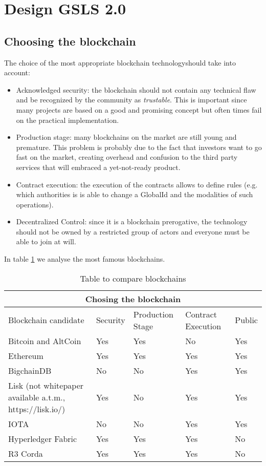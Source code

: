 
\section{Design GSLS 2.0}

\subsection{Choosing the blockchain}
The choice of the most appropriate blockchain technologyshould take into account:

\begin{itemize}
  \item Acknowledged security: the blockchain should not contain any technical flaw and be recognized by the community as \textit{trustable}. This is important since many projects are based on a good and promising concept but often times fail on the practical implementation.
  \item Production stage: many blockchains on the market are still young and premature. This problem is probably due to the fact that investors want to go fast on the market, creating overhead and confusion to the third party services that will embraced a yet-not-ready product.
  \item Contract execution: the execution of the contracts allows to define rules (e.g. which authorities is is able to change a GlobalId and the modalities of such operations).
  \item Decentralized Control: since it is a blockchain prerogative, the technology should not be owned by a restricted group of actors and everyone must be able to join at will.
\end{itemize}

In table \ref{table:1} we analyse the most famous blockchains.

\begin{table}[h!]
\centering
\begin{tabular}{ |p{7cm}|p{2cm}|p{2cm}|p{2cm}|p{2cm}|  }
\hline
\multicolumn{5}{|c|}{Chosing the blockchain} \\
\hline
Blockchain candidate & Security & Production Stage & Contract Execution & Public \\
\hline
Bitcoin and AltCoin \cite{Nakamoto_bitcoin:a} & Yes & Yes & No\cite{Bitcoin_notTuringComplete} & Yes \\
\hline
Ethereum \cite{ethereum_whitepaper} & Yes & Yes & Yes & Yes \\
\hline
BigchainDB \cite{bigchaindb_whitepaper} & No \cite{_bigchaindb_bullshit} \ & No & Yes & Yes \\
\hline
Lisk (not whitepaper available a.t.m., https://lisk.io/)& Yes & No \cite{lisk_problems} & Yes & Yes \\
\hline
IOTA \cite{iota_whitepaper}& No \cite{iota_problems} & No & Yes & Yes \\
\hline
Hyperledger Fabric \cite{martindale_fabric:_2017}& Yes & Yes & Yes & No \\
\hline
R3 Corda \cite{corda_whitepaper}& Yes & Yes & Yes & No \\
\hline
\end{tabular}
\caption{Table to compare blockchains}
\label{table:1}
\end{table}

